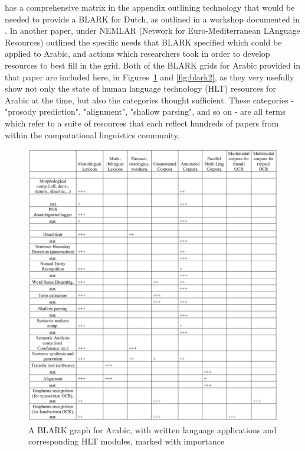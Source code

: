 \citet{krauwer2003basic} has a comprehensive matrix in the appendix outlining technology that would be needed to provide a BLARK for Dutch, as outlined in a workshop documented in \citet{binnenpoorte2002towards}. In another paper, \citet{maegaard2006blark} under NEMLAR (Network  for  Euro-Mediterranean  LAnguage  Resources) outlined the specific needs that BLARK specified which could be applied to Arabic, and actions which researchers took in order to develop resources to best fill in the grid. Both of the BLARK grids for Arabic provided in that paper are included here, in Figures~\ref{fig:blark1} and \ref{fig:blark2}, as they very usefully show not only the state of human language technology (HLT) resources for Arabic at the time, but also the categories thought sufficient. These categories - "prosody prediction", "alignment", "shallow parsing", and so on - are all terms which refer to a suite of resources that each reflect hundreds of papers from within the computational linguistics community.

\begin{figure}
 \centering
 \includegraphics[width=1\textwidth]{img/blark1.png}
 \caption{A BLARK graph for Arabic, with written language applications and corresponding HLT modules, marked with importance \citep[775]{maegaard2006blark}}
 \label{fig:blark1}
\end{figure}

